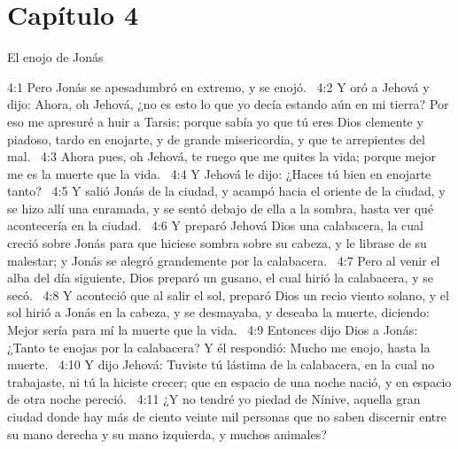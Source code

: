\section*{Capítulo 4 }

El enojo de Jonás  

4:1 Pero Jonás se apesadumbró en extremo, y se enojó.  
4:2 Y oró a Jehová y dijo: Ahora, oh Jehová, ¿no es esto lo que yo decía estando aún en mi tierra? Por eso me apresuré a huir a Tarsis; porque sabía yo que tú eres Dios clemente y piadoso, tardo en enojarte, y de grande misericordia, y que te arrepientes del mal.  
4:3 Ahora pues, oh Jehová, te ruego que me quites la vida; porque mejor me es la muerte que la vida.  
4:4 Y Jehová le dijo: ¿Haces tú bien en enojarte tanto?  
4:5 Y salió Jonás de la ciudad, y acampó hacia el oriente de la ciudad, y se hizo allí una enramada, y se sentó debajo de ella a la sombra, hasta ver qué acontecería en la ciudad.  
4:6 Y preparó Jehová Dios una calabacera, la cual creció sobre Jonás para que hiciese sombra sobre su cabeza, y le librase de su malestar; y Jonás se alegró grandemente por la calabacera.  
4:7 Pero al venir el alba del día siguiente, Dios preparó un gusano, el cual hirió la calabacera, y se secó.  
4:8 Y aconteció que al salir el sol, preparó Dios un recio viento solano, y el sol hirió a Jonás en la cabeza, y se desmayaba, y deseaba la muerte, diciendo: Mejor sería para mí la muerte que la vida.  
4:9 Entonces dijo Dios a Jonás: ¿Tanto te enojas por la calabacera? Y él respondió: Mucho me enojo, hasta la muerte.  
4:10 Y dijo Jehová: Tuviste tú lástima de la calabacera, en la cual no trabajaste, ni tú la hiciste crecer; que en espacio de una noche nació, y en espacio de otra noche pereció.  
4:11 ¿Y no tendré yo piedad de Nínive, aquella gran ciudad donde hay más de ciento veinte mil personas que no saben discernir entre su mano derecha y su mano izquierda, y muchos animales?